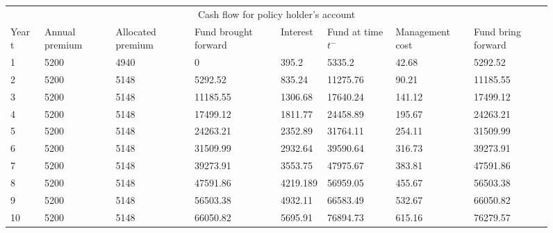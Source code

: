 \documentclass{report}
\begin{document}
\begin{figure}[h]
    \begin{tabular}{p{1cm} p{1.5cm} p{2cm} p{1.5cm} p{1cm} p{1.5cm} p{2cm} p{1.5cm} }
\toprule
\multicolumn{8}{c}{Cash flow for policy holder's account} \\
\cmidrule(r){3-7}

Year t & Annual premium & Allocated premium & Fund brought forward & Interest & Fund at time $t^-$ & Management cost & Fund bring forward \\
\midrule
1	&5200	&4940	&0&	395.2	&5335.2	&42.68	&5292.52\\
2	&5200	&5148	&5292.52	 &   835.24	&11275.76 &	90.21	&11185.55\\
3	&5200	&5148	&11185.55&  1306.68	&17640.24	&141.12  &17499.12\\
4&	5200	&5148	&17499.12&  1811.77&	24458.89	&    195.67       &24263.21\\
5&	5200	&5148&	24263.21	&    2352.89&	31764.11	&   254.11	&31509.99\\
6&	5200	&5148&	31509.99	&   2932.64&	39590.64	&   316.73	&39273.91\\
7&	5200	&5148&	39273.91	&   3553.75&	47975.67	&   383.81	&47591.86\\
8&	5200	&5148&	47591.86	&   4219.189&	56959.05	&  455.67	    &56503.38\\
9&	5200	&5148&	56503.38	&   4932.11&	66583.49	&  532.67 	&66050.82\\
10&	5200	&5148	&66050.82	&5695.91	&76894.73	&615.16	&76279.57\\
\bottomrule
\end{tabular}
\end{figure}
\end{document}

